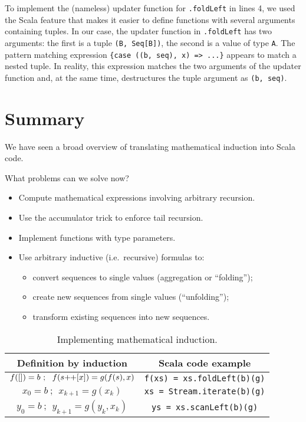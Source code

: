 \noindent To implement the (nameless) updater function for \lstinline!.foldLeft!
in lines 4, we used the Scala feature that makes it easier
to define functions with several arguments containing tuples. In our
case, the updater function in \lstinline!.foldLeft! has two arguments:
the first is a tuple \lstinline!(B, Seq[B])!, the second is a value
of type \lstinline!A!. The pattern matching expression \lstinline!{case ((b, seq), x) => ...}!
appears to match a nested tuple. In reality,
this expression matches the two arguments of the updater function
and, at the same time, destructures the tuple argument as \lstinline!(b, seq)!. 

\section{Summary}

We have seen a broad overview of translating mathematical induction
into Scala code.

What problems can we solve now?
\begin{itemize}
\item Compute mathematical expressions involving arbitrary recursion.
\item Use the accumulator trick to enforce tail recursion.
\item Implement functions with type parameters.
\item Use arbitrary inductive (i.e.\ recursive) formulas to:
\begin{itemize}
\item convert sequences to single values (aggregation or ``folding'');
\item create new sequences from single values (``unfolding'');
\item transform existing sequences into new sequences.
\end{itemize}
\end{itemize}
\begin{wraptable}{l}{0.59\columnwidth}%
\begin{centering}
\vspace{-0.5\baselineskip}
\begin{tabular}{|c|c|}
\hline 
\textbf{\small{}Definition by induction} & \textbf{\small{}Scala code example}\tabularnewline
\hline 
\hline 
{\small{}$f(\left[\right])=b~;~~f(s\negmedspace+\negthickspace+[x])=g(f(s),x)$} & {\small{}}\lstinline!f(xs) = xs.foldLeft(b)(g)!\tabularnewline
\hline 
{\small{}$x_{0}=b~;~~x_{k+1}=g(x_{k})$} & {\small{}}\lstinline!xs = Stream.iterate(b)(g)!\tabularnewline
\hline 
{\small{}$y_{0}=b~;~~y_{k+1}=g(y_{k},x_{k})$} & {\small{}}\lstinline!ys = xs.scanLeft(b)(g)!\tabularnewline
\hline 
\end{tabular}
\par\end{centering}
\caption{Implementing mathematical induction.\label{tab:Implementing-mathematical-induction}}
\vspace{-0.75\baselineskip}
\end{wraptable}%

